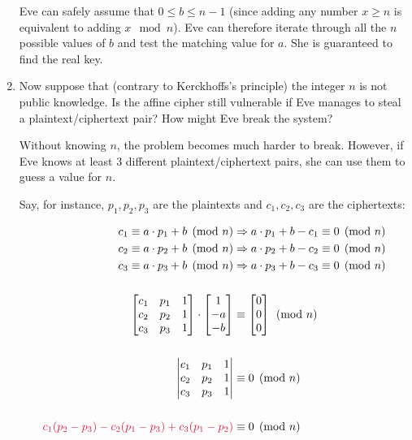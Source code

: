 \begin{problem}
\begin{enumerate}
\begin{Answer}
\noindent
Eve can safely assume that $0 \le b \le n-1$ 
(since adding any number $x \ge n$ is equivalent to adding
$x \mod n$). Eve can therefore iterate through all the $n$ possible values of $b$ and
test the matching value for $a$. She is guaranteed to find the real key.

\end{Answer}
\item Now suppose that (contrary to Kerckhoffs's principle) the integer $n$ is not public knowledge.
Is the affine cipher still vulnerable if Eve manages to steal a plaintext/ciphertext pair?
How might Eve break the system?

\begin{Answer}
Without knowing $n$, the problem becomes much harder to break.
However, if Eve knows at least $3$ different plaintext/ciphertext pairs,
she can use them to guess a value for $n$.

\noindent
Say, for instance, $p_1, p_2, p_3$ are the plaintexts and $c_1, c_2, c_3$ are the ciphertexts:

\begin{align*}
  c_1 \equiv a \cdot p_1 + b \pmod n &\Rightarrow a \cdot p_1 + b - c_1 \equiv 0 \pmod n\\
  c_2 \equiv a \cdot p_2 + b \pmod n &\Rightarrow a \cdot p_2 + b - c_2 \equiv 0 \pmod n\\
  c_3 \equiv a \cdot p_3 + b \pmod n &\Rightarrow a \cdot p_3 + b - c_3 \equiv 0 \pmod n\\
  \\
  \begin{bmatrix}
    c_1 & p_1 & 1\\
    c_2 & p_2 & 1\\
    c_3 & p_3 & 1
  \end{bmatrix} \cdot \begin{bmatrix}
    1\\
    -a\\
    -b
  \end{bmatrix} &\equiv \begin{bmatrix}
    0\\
    0\\
    0
  \end{bmatrix} \pmod n\\
  \\
  \begin{vmatrix}
    c_1 & p_1 & 1\\
    c_2 & p_2 & 1\\
    c_3 & p_3 & 1
  \end{vmatrix} &\equiv 0 \pmod n\\
  \\
  \color{crimson}
  c_1(p_2-p_3) - c_2(p_1-p_3) + c_3(p_1 - p_2) &\equiv 0 \pmod n \\
  \color{black} \\
\end{align*}


\end{Answer}
\end{enumerate}
\end{problem}
